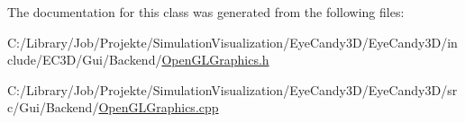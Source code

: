 The documentation for this class was generated from the following files\+:\begin{DoxyCompactItemize}
\item 
C\+:/\+Library/\+Job/\+Projekte/\+Simulation\+Visualization/\+Eye\+Candy3\+D/\+Eye\+Candy3\+D/include/\+E\+C3\+D/\+Gui/\+Backend/\mbox{\hyperlink{_open_g_l_graphics_8h}{Open\+G\+L\+Graphics.\+h}}\item 
C\+:/\+Library/\+Job/\+Projekte/\+Simulation\+Visualization/\+Eye\+Candy3\+D/\+Eye\+Candy3\+D/src/\+Gui/\+Backend/\mbox{\hyperlink{_open_g_l_graphics_8cpp}{Open\+G\+L\+Graphics.\+cpp}}\end{DoxyCompactItemize}
